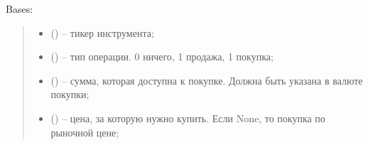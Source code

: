 \documentclass[letterpaper,10pt,english,openany,oneside]{sphinxmanual}
\begin{document}
\begin{fulllineitems}
\label{\detokenize{src.structures:src.structures.st_purchase.StockPurchaseRequest}}
\pysigstartsignatures
{}
\pysigstopsignatures
\sphinxAtStartPar
Bases: 

\begin{fulllineitems}
\label{\detokenize{src.structures:src.structures.st_purchase.StockPurchaseRequest.__init__}}
\pysigstartsignatures
{}
\pysigstopsignatures\begin{quote}\begin{description}
\begin{itemize}
\item {} 
\sphinxAtStartPar
{} () – тикер инструмента;

\item {} 
\sphinxAtStartPar
{} ({\hyperref[\detokenize{src.structures:src.structures.st_strategies.TypeAction}]{}}) – тип операции. 0 \sphinxhyphen{} ничего, \sphinxhyphen{}1 \sphinxhyphen{} продажа, 1 \sphinxhyphen{} покупка;

\item {} 
\sphinxAtStartPar
{} () – сумма, которая доступна к покупке. Должна быть указана в валюте покупки;

\item {} 
\sphinxAtStartPar
{} (\sphinxstyleliteralemphasis{\sphinxupquote{{[}}}\sphinxstyleliteralemphasis{\sphinxupquote{{]}}}) – цена, за которую нужно купить. Если None, то покупка по рыночной цене;


\end{itemize}
\end{description}
\end{quote}
\end{fulllineitems}
\end{fulllineitems}
\end{document}
